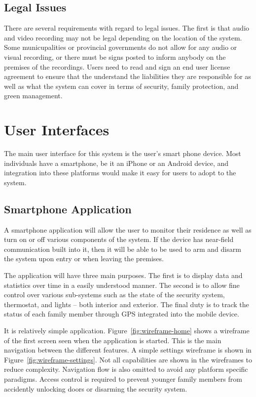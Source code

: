 \documentclass{report}
\begin{document}
\section{Legal Issues}
There are several requirements with regard to legal issues. The first is that
audio and video recording may not be legal depending on the location of the
system. Some municupalities or provincial governments do not allow for any
audio or visual recording, or there must be signs posted to inform anybody on
the premises of the recordings. Users need to read and sign an end user
license agreement to ensure that the understand the liabilities they are
responsible for as well as what the system can cover in terms of security,
family protection, and green management.


\chapter{User Interfaces}
\label{ch:user-interfaces}
The main user interface for this system is the user's smart phone device. Most
individuals have a smartphone, be it an iPhone or an Android device, and
integration into these platforms would make it easy for users to adopt to the
system.

\section{Smartphone Application}
\label{sec:mobile-app}
A smartphone application will allow the user to monitor their residence as well
as turn on or off various components of the system. If the device has
near-field communication built into it, then it will be able to be used to
arm and disarm the system upon entry or when leaving the premises. 

The application will have three main purposes. The first is to display data and
statistics over time in a easily understood manner. The second is to allow fine
control over various sub-systems such as the state of the security system,
thermostat, and lights -- both interior and exterior. The final duty is to
track the status of each family member through GPS integrated into the mobile
device. 

It is relatively simple application. Figure~\ref{fig:wireframe-home} shows a
wireframe of the first screen seen when the application is started. This is the
main navigation between the different features. A simple settings wireframe is
shown in Figure~\ref{fig:wireframe-settings}. Not all capabilities are shown in
the wireframes to reduce complexity. Navigation flow is also omitted to avoid
any platform specific paradigms. Access control is required to prevent younger
family members from accidently unlocking doors or disarming the security
system.
\end{document}
